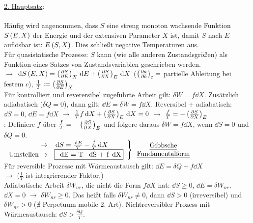 \setlength{\tabcolsep}{1pt}
\renewcommand{\arraystretch}{1}

\uline{2. Hauptsatz}:\\
\\
Häufig wird angenommen, dass $S$ eine streng monoton wachsende Funktion $S\left( E,X \right)$ der Energie und der extensiven Parameter $X$ ist, damit $S$ nach $E$ auflösbar ist: $E\left( S,X \right)$. Dies schließt negative Temperaturen aus.\\
Für quasistatische Prozesse: $S$ kann (wie alle anderen Zustandsgrößen) als Funktion eines Satzes von Zustandsvariablen geschrieben werden.\\
$\rightarrow$ $\,\text d{S}\left( E,X \right) = \left(\frac{\partial S}{\partial E}\right)_{X} \,\text d{E} + \left(\frac{\partial S}{\partial X}\right)_{E}\,\text d{X}$ ($\left(\frac{\partial a}{\partial b}\right)_{c} =$ partielle Ableitung bei festem $c$), $\frac{1}{T} \vcentcolon = \left(\frac{\partial S}{\partial E}\right)_{X}$\\
Für kontrolliert und reverersibel zugeführte Arbeit gilt: $\delta W = f\dd{X}$. Zusätzlich adiabatisch ($\delta Q =0$), dann gilt: $\dd{E}= \delta W = f\dd{X}$. Reversibel $+$ adiabatisch: $\dd{S} = 0$, $\dd{E} = f\dd{X}$ $\rightarrow$ $\frac{1}{T}f\,\text d{X} +\left(\frac{\partial S}{\partial X}\right)_{E}\,\text d{X} = 0$ $\rightarrow$ $\frac{f}{T} = -\left(\frac{\partial S}{\partial X}\right)_{E}$\\
: Definiere $f$ über $\frac{f}{T} = -\left(\frac{\partial S}{\partial X}\right)_{E}$ und folgere daraus $\delta W = f\dd{X}$, wenn $\dd{S} = 0$ und $\delta Q= 0$.\\
$\left.\begin{array}{r l}\rightarrow & \dd{S} = \frac{\dd{E}}{T} - \frac{f}{T} \dd{X}\\ \text{Umstellen} \rightarrow & \text{\fbox{\dd{E} = T \dd{S} + f\dd{X}}}\end{array}\right\}\begin{array}{c}\text{\uline{Gibbsche}}\\\text{\uline{Fundamentalform}}\end{array}$\\
Für reversible Prozesse mit Wärmeaustausch gilt: $\dd{E} = \delta Q + f\dd{X}$\\
$\rightarrow$  ($\frac{1}{T}$ ist integrierender Faktor.)\\
Adiabatische Arbeit $\delta W_{nr}$, die nicht die Form $f\dd{X}$ hat: $\dd{S} \geq 0$, $\dd{E} = \delta W_{nr}$, $\dd{X} = 0$ $\rightarrow$ $\delta W_{nr} \geq 0$. Das heißt falls $\delta W_{nr} \neq 0$, dann $\dd{S} > 0$ (irreversibel) und $\delta W_{nr} > 0$ ($\nexists$ Perpetuum mobile 2. Art). Nichtreversibler Prozess mit Wärmeaustausch: $\dd{S} > \frac{\delta Q}{T}$.\\

